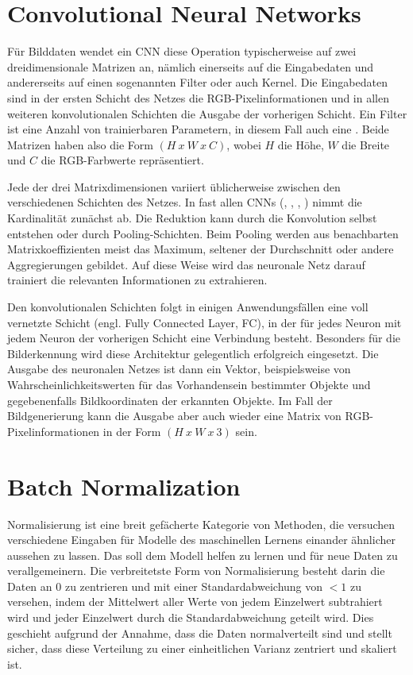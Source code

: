 \section{Convolutional Neural Networks}
\label{sec:cnn}
Für Bilddaten wendet ein CNN diese Operation typischerweise auf zwei dreidimensionale Matrizen an, nämlich einerseits auf die Eingabedaten und andererseits auf einen sogenannten Filter oder auch Kernel. Die Eingabedaten sind in der ersten Schicht des Netzes die RGB-Pixelinformationen und in allen weiteren konvolutionalen Schichten die Ausgabe der vorherigen Schicht. Ein Filter ist eine Anzahl von trainierbaren Parametern, in diesem Fall auch eine . Beide Matrizen haben also die Form $(H\ x\ W\ x\ C)$, wobei $H$ die Höhe, $W$ die Breite und $C$ die RGB-Farbwerte repräsentiert.

Jede der drei Matrixdimensionen variiert üblicherweise zwischen den verschiedenen Schichten des Netzes. In fast allen CNNs (\cite{goodfellow2016deeplearning}, \cite{Lecun99objectrecognition}, \cite{RFB15a}, \cite{isola2018imagetoimage}) nimmt die Kardinalität zunächst ab. Die Reduktion kann durch die Konvolution selbst entstehen oder durch Pooling-Schichten. Beim Pooling werden aus benachbarten Matrixkoeffizienten meist das Maximum, seltener der Durchschnitt oder andere Aggregierungen gebildet. Auf diese Weise wird das neuronale Netz darauf trainiert die relevanten Informationen zu extrahieren. \cite{goodfellow2016deeplearning}

Den konvolutionalen Schichten folgt in einigen Anwendungsfällen eine voll vernetzte Schicht (engl. Fully Connected Layer, FC), in der für jedes Neuron mit jedem Neuron der vorherigen Schicht eine Verbindung besteht. Besonders für die Bilderkennung wird diese Architektur gelegentlich erfolgreich eingesetzt. Die Ausgabe des neuronalen Netzes ist dann ein Vektor, beispielsweise von Wahrscheinlichkeitswerten für das Vorhandensein bestimmter Objekte und gegebenenfalls Bildkoordinaten der erkannten Objekte. Im Fall der Bildgenerierung kann die Ausgabe aber auch wieder eine Matrix von RGB-Pixelinformationen in der Form $(H\ x\ W\ x\ 3)$ sein.

\section{Batch Normalization}
Normalisierung ist eine breit gefächerte Kategorie von Methoden, die versuchen verschiedene Eingaben für Modelle des maschinellen Lernens einander ähnlicher aussehen zu lassen. Das soll dem Modell helfen zu lernen und für neue Daten zu verallgemeinern. Die verbreitetste Form von Normalisierung besteht darin die Daten an $0$ zu zentrieren und mit einer Standardabweichung von $<1$ zu versehen, indem der Mittelwert aller Werte von jedem Einzelwert subtrahiert wird und jeder Einzelwert durch die Standardabweichung geteilt wird. Dies geschieht aufgrund der Annahme, dass die Daten normalverteilt sind und stellt sicher, dass diese Verteilung zu einer einheitlichen Varianz zentriert und skaliert ist.

